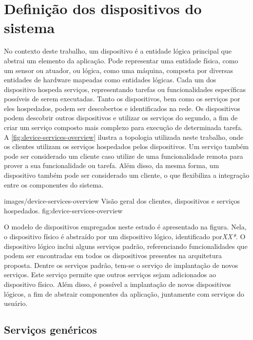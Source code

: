 \section{Definição dos dispositivos do sistema}

No contexto deste trabalho, um dispositivo é a entidade lógica principal que abstrai um elemento da
aplicação. Pode representar uma entidade física, como um sensor ou atuador, ou lógica, como uma
máquina, composta por diversas entidades de hardware mapeadas como entidades lógicas. Cada um dos
dispositivo hospeda serviços, representando tarefas ou funcionalidades específicas possíveis de
serem executadas. Tanto os dispositivos, bem como os serviços por eles hospedados, podem ser
descobertos e identificados na rede. Os dispositivos podem descobrir outros dispositivos e utilizar
os serviços do segundo, a fim de criar um serviço composto mais complexo para execução de
determinada tarefa. A \cref{fig:device-services-overview} ilustra a topologia utilizada neste
trabalho, onde os clientes utilizam os serviços hospedados pelos dispositivos. Um serviço também
pode ser considerado um cliente caso utilize de uma funcionalidade remota para prover a sua
funcionalidade ou tarefa. Além disso, da mesma forma, um dispositivo também pode ser considerado um
cliente, o que flexibiliza a integração entre os componentes do sistema.

    {images/device-services-overview}
    {Visão geral dos clientes, dispositivos e serviços hospedados.}
    {fig:device-services-overview}

O modelo de dispositivos empregados neste estudo é apresentado na figura. Nela,
o dispositivo físico é abstraído por um dispositivo lógico, identificado por\textit{XX*}. O
dispositivo lógico inclui alguns serviços padrão, referenciando funcionalidades que podem ser
encontradas em todos os dispositivos presentes na arquitetura proposta. Dentre os serviços padrão,
tem-se o serviço de implantação de novos serviços. Este serviço permite que outros serviços sejam
adicionados ao dispositivo físico. Além disso, é possível a implantação de novos dispositivos
lógicos, a fim de abstrair componentes da aplicação, juntamente com serviços do
usuário.


\subsection{Serviços genéricos}

